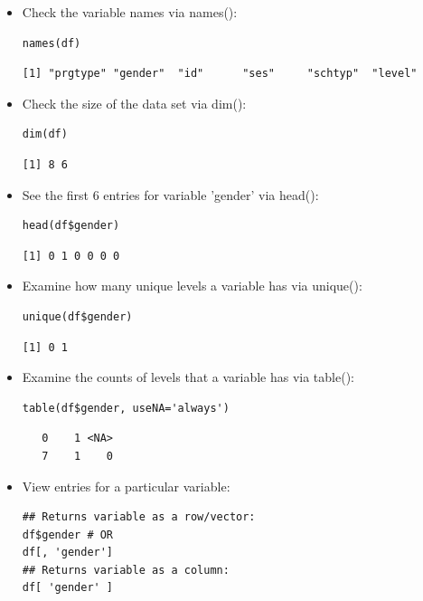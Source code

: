 \begin{frame}
\begin{itemize}
\newpage
		\item Check the variable names via \ttfamily names(): \normalfont 
\begin{lstlisting}
names(df)
\end{lstlisting}

{ \footnotesize
	\begin{verbatim}
[1] "prgtype" "gender"  "id"      "ses"     "schtyp"  "level"
	\end{verbatim}
}	
		\item Check the size of the data set via \ttfamily dim(): \normalfont 
\begin{lstlisting}
dim(df)
\end{lstlisting}

\begin{verbatim}
[1] 8 6
\end{verbatim}	
		\item See the first 6 entries for variable 'gender' via \ttfamily head(): \normalfont 
\begin{lstlisting}
head(df$gender)
\end{lstlisting}

\begin{verbatim}
[1] 0 1 0 0 0 0
\end{verbatim}	

\newpage
	\item Examine how many unique levels a variable has via \ttfamily unique(): \normalfont
\begin{lstlisting}
unique(df$gender)
\end{lstlisting}

\begin{verbatim}
[1] 0 1
\end{verbatim}	
	\item Examine the counts of levels that a variable has via \ttfamily table(): \normalfont
\begin{lstlisting}
table(df$gender, useNA='always')
\end{lstlisting}

\begin{verbatim}
   0    1 <NA> 
   7    1    0 
\end{verbatim}	

\newpage
		\item View entries for a particular variable:
\begin{lstlisting}
## Returns variable as a row/vector:
df$gender # OR
df[, 'gender'] 
## Returns variable as a column: 
df[ 'gender' ] 
\end{lstlisting}		


\end{itemize}
\end{frame}
